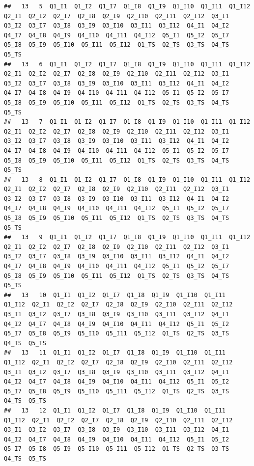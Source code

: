 \documentclass[
]{book}
\begin{document}
\begin{verbatim}
##   13   5  Q1_I1  Q1_I2  Q1_I7  Q1_I8  Q1_I9  Q1_I10  Q1_I11  Q1_I12  Q2_I1  Q2_I2  Q2_I7  Q2_I8  Q2_I9  Q2_I10  Q2_I11  Q2_I12  Q3_I1  Q3_I2  Q3_I7  Q3_I8  Q3_I9  Q3_I10  Q3_I11  Q3_I12  Q4_I1  Q4_I2  Q4_I7  Q4_I8  Q4_I9  Q4_I10  Q4_I11  Q4_I12  Q5_I1  Q5_I2  Q5_I7  Q5_I8  Q5_I9  Q5_I10  Q5_I11  Q5_I12  Q1_TS  Q2_TS  Q3_TS  Q4_TS  Q5_TS
##   13   6  Q1_I1  Q1_I2  Q1_I7  Q1_I8  Q1_I9  Q1_I10  Q1_I11  Q1_I12  Q2_I1  Q2_I2  Q2_I7  Q2_I8  Q2_I9  Q2_I10  Q2_I11  Q2_I12  Q3_I1  Q3_I2  Q3_I7  Q3_I8  Q3_I9  Q3_I10  Q3_I11  Q3_I12  Q4_I1  Q4_I2  Q4_I7  Q4_I8  Q4_I9  Q4_I10  Q4_I11  Q4_I12  Q5_I1  Q5_I2  Q5_I7  Q5_I8  Q5_I9  Q5_I10  Q5_I11  Q5_I12  Q1_TS  Q2_TS  Q3_TS  Q4_TS  Q5_TS
##   13   7  Q1_I1  Q1_I2  Q1_I7  Q1_I8  Q1_I9  Q1_I10  Q1_I11  Q1_I12  Q2_I1  Q2_I2  Q2_I7  Q2_I8  Q2_I9  Q2_I10  Q2_I11  Q2_I12  Q3_I1  Q3_I2  Q3_I7  Q3_I8  Q3_I9  Q3_I10  Q3_I11  Q3_I12  Q4_I1  Q4_I2  Q4_I7  Q4_I8  Q4_I9  Q4_I10  Q4_I11  Q4_I12  Q5_I1  Q5_I2  Q5_I7  Q5_I8  Q5_I9  Q5_I10  Q5_I11  Q5_I12  Q1_TS  Q2_TS  Q3_TS  Q4_TS  Q5_TS
##   13   8  Q1_I1  Q1_I2  Q1_I7  Q1_I8  Q1_I9  Q1_I10  Q1_I11  Q1_I12  Q2_I1  Q2_I2  Q2_I7  Q2_I8  Q2_I9  Q2_I10  Q2_I11  Q2_I12  Q3_I1  Q3_I2  Q3_I7  Q3_I8  Q3_I9  Q3_I10  Q3_I11  Q3_I12  Q4_I1  Q4_I2  Q4_I7  Q4_I8  Q4_I9  Q4_I10  Q4_I11  Q4_I12  Q5_I1  Q5_I2  Q5_I7  Q5_I8  Q5_I9  Q5_I10  Q5_I11  Q5_I12  Q1_TS  Q2_TS  Q3_TS  Q4_TS  Q5_TS
##   13   9  Q1_I1  Q1_I2  Q1_I7  Q1_I8  Q1_I9  Q1_I10  Q1_I11  Q1_I12  Q2_I1  Q2_I2  Q2_I7  Q2_I8  Q2_I9  Q2_I10  Q2_I11  Q2_I12  Q3_I1  Q3_I2  Q3_I7  Q3_I8  Q3_I9  Q3_I10  Q3_I11  Q3_I12  Q4_I1  Q4_I2  Q4_I7  Q4_I8  Q4_I9  Q4_I10  Q4_I11  Q4_I12  Q5_I1  Q5_I2  Q5_I7  Q5_I8  Q5_I9  Q5_I10  Q5_I11  Q5_I12  Q1_TS  Q2_TS  Q3_TS  Q4_TS  Q5_TS
##   13   10  Q1_I1  Q1_I2  Q1_I7  Q1_I8  Q1_I9  Q1_I10  Q1_I11  Q1_I12  Q2_I1  Q2_I2  Q2_I7  Q2_I8  Q2_I9  Q2_I10  Q2_I11  Q2_I12  Q3_I1  Q3_I2  Q3_I7  Q3_I8  Q3_I9  Q3_I10  Q3_I11  Q3_I12  Q4_I1  Q4_I2  Q4_I7  Q4_I8  Q4_I9  Q4_I10  Q4_I11  Q4_I12  Q5_I1  Q5_I2  Q5_I7  Q5_I8  Q5_I9  Q5_I10  Q5_I11  Q5_I12  Q1_TS  Q2_TS  Q3_TS  Q4_TS  Q5_TS
##   13   11  Q1_I1  Q1_I2  Q1_I7  Q1_I8  Q1_I9  Q1_I10  Q1_I11  Q1_I12  Q2_I1  Q2_I2  Q2_I7  Q2_I8  Q2_I9  Q2_I10  Q2_I11  Q2_I12  Q3_I1  Q3_I2  Q3_I7  Q3_I8  Q3_I9  Q3_I10  Q3_I11  Q3_I12  Q4_I1  Q4_I2  Q4_I7  Q4_I8  Q4_I9  Q4_I10  Q4_I11  Q4_I12  Q5_I1  Q5_I2  Q5_I7  Q5_I8  Q5_I9  Q5_I10  Q5_I11  Q5_I12  Q1_TS  Q2_TS  Q3_TS  Q4_TS  Q5_TS
##   13   12  Q1_I1  Q1_I2  Q1_I7  Q1_I8  Q1_I9  Q1_I10  Q1_I11  Q1_I12  Q2_I1  Q2_I2  Q2_I7  Q2_I8  Q2_I9  Q2_I10  Q2_I11  Q2_I12  Q3_I1  Q3_I2  Q3_I7  Q3_I8  Q3_I9  Q3_I10  Q3_I11  Q3_I12  Q4_I1  Q4_I2  Q4_I7  Q4_I8  Q4_I9  Q4_I10  Q4_I11  Q4_I12  Q5_I1  Q5_I2  Q5_I7  Q5_I8  Q5_I9  Q5_I10  Q5_I11  Q5_I12  Q1_TS  Q2_TS  Q3_TS  Q4_TS  Q5_TS

\end{verbatim}
\end{document}
